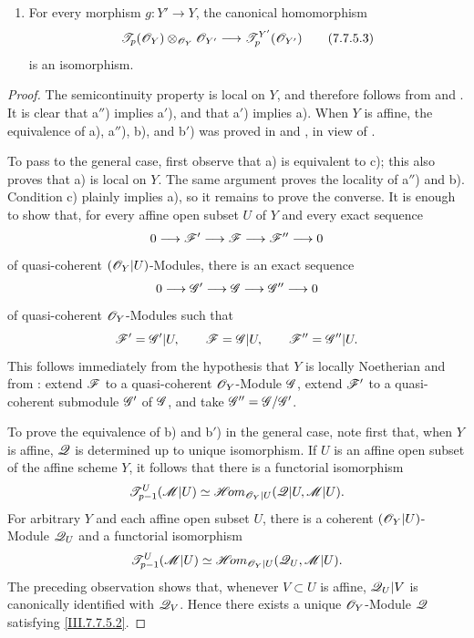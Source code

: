 {\begin{theorem}[7.7.5]
\begin{enumerate}
  \item[d)] For every morphism $g:Y'\to Y$, the canonical
    homomorphism
    \[
      \sh{T}_p(\sh{O}_Y)
      \otimes_{\sh{O}_Y}\sh{O}_{Y'}
      \longrightarrow
      \sh{T}^{Y'}_p(\sh{O}_{Y'})
      \tag{7.7.5.3}\label{III.7.7.5.3}
    \]
    is an isomorphism.
\end{enumerate}
\end{theorem}

\begin{proof}
The semicontinuity property is local on $Y$, and therefore
follows from  and .  It is
clear that a$''$) implies a$'$), and that a$'$) implies a).
When $Y$ is affine, the equivalence of a), a$''$), b), and
b$'$) was proved in  and
, in view of .

To pass to the general case, first observe that a) is
equivalent to c); this also proves that a) is local on $Y$.
The same argument proves the locality of a$''$) and b).
Condition c) plainly implies a), so it remains to prove the
converse.  It is enough to show that, for every affine open
subset $U$ of $Y$ and every exact sequence
\[
  0\longrightarrow\mathscr{F}'
  \longrightarrow\mathscr{F}
  \longrightarrow\mathscr{F}''
  \longrightarrow0
\]
of quasi-coherent $(\mathscr{O}_Y|U)$-Modules, there is an exact
sequence
\[
  0\longrightarrow\mathscr{G}'
  \longrightarrow\mathscr{G}
  \longrightarrow\mathscr{G}''
  \longrightarrow0
\]
of quasi-coherent $\mathscr{O}_Y$-Modules such that
\[
  \mathscr{F}'=\mathscr{G}'|U,
  \qquad
  \mathscr{F}=\mathscr{G}|U,
  \qquad
  \mathscr{F}''=\mathscr{G}''|U.
\]
This follows immediately from the hypothesis that $Y$ is
locally Noetherian and from : extend
$\mathscr{F}$ to a quasi-coherent $\mathscr{O}_Y$-Module $\mathscr{G}$,
extend $\mathscr{F}'$ to a quasi-coherent submodule $\mathscr{G}'$ of
$\mathscr{G}$, and take $\mathscr{G}''=\mathscr{G}/\mathscr{G}'$.

To prove the equivalence of b) and b$'$) in the general
case, note first that, when $Y$ is affine, $\mathscr{Q}$ is
determined up to unique isomorphism.  If $U$ is an affine
open subset of the affine scheme $Y$, it follows that there
is a functorial isomorphism
\[
  \mathscr{T}^{U}_{p-1}(\mathscr{M}|U)
  \simeq
  \mathscr{H}\!om_{\mathscr{O}_Y|U}
    (\mathscr{Q}|U,\mathscr{M}|U).
\]
For arbitrary $Y$ and each affine open subset $U$, there is
a coherent $(\mathscr{O}_Y|U)$-Module $\mathscr{Q}_U$ and a
functorial isomorphism
\[
  \mathscr{T}^{U}_{p-1}(\mathscr{M}|U)
  \simeq
  \mathscr{H}\!om_{\mathscr{O}_Y|U}
    (\mathscr{Q}_U,\mathscr{M}|U).
\]
The preceding observation shows that, whenever $V\subset U$
is affine, $\mathscr{Q}_U|V$ is canonically identified with
$\mathscr{Q}_V$.  Hence there exists a unique
$\mathscr{O}_Y$-Module $\mathscr{Q}$ satisfying
\eqref{III.7.7.5.2}.


\end{proof}}
